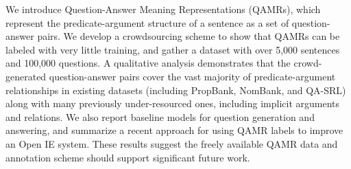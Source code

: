 We introduce Question-Answer Meaning Representations (QAMRs), which represent the predicate-argument structure of a sentence as a set of question-answer pairs. We develop a crowdsourcing scheme to show that QAMRs can be labeled with very little training, and gather a dataset with over 5,000 sentences and 100,000 questions. A qualitative analysis demonstrates that the crowd-generated question-answer pairs cover the vast majority of predicate-argument relationships in existing datasets (including PropBank, NomBank, and QA-SRL) along with many previously under-resourced ones, including implicit arguments and relations. We also report baseline models for question generation and answering, and summarize a recent approach for using QAMR labels to improve an Open IE system. These results suggest the freely available QAMR data and annotation scheme should support significant future work.
